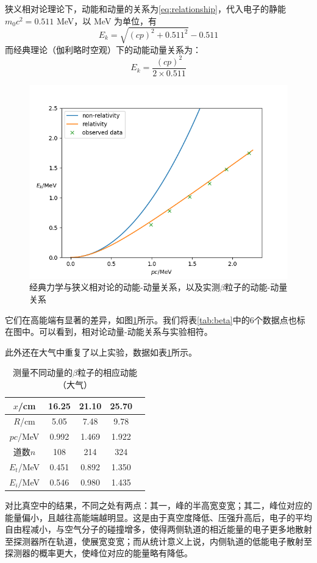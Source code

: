 \documentclass[aps,pre,12pt,preprint,onecolumn,showpacs,showkeys]{revtex4-1}
\begin{document}
    狭义相对论理论下，动能和动量的关系为\ref{eq:relationship}，代入电子的静能$m_0 c^2 = 0.511$ MeV，以 MeV 为单位，有
    \begin{equation}
        E_k = \sqrt{(cp)^2 +0.511 ^2}-0.511
    \end{equation}
    而经典理论（伽利略时空观）下的动能动量关系为：
    \begin{equation}
        E_k =\frac{ (cp)^2 }{2 \times 0.511}
    \end{equation}
    \begin{figure}[ht]
        \centering
        \includegraphics[width=120mm]{relationship}
        \caption{\label{fig:relationship}%
        经典力学与狭义相对论的动能-动量关系，以及实测$\beta$粒子的动能-动量关系}
    \end{figure}
    它们在高能端有显著的差异，如图\ref{fig:relationship}所示。我们将表\ref{tab:beta}中的6个数据点也标在图中。可以看到，相对论动量-动能关系与实验相符。

    此外还在大气中重复了以上实验，数据如表\ref{tab:beta_atmo}所示。
    \begin{table}[h]
        \caption{\label{tab:beta_atmo}%
        测量不同动量的$\beta$粒子的相应动能（大气）}
        \begin{tabular}{|c|c|c|c|c|}
            \hline
            $x$/cm & 16.25 & 21.10 & 25.70\\\hline 
            $R$/cm & 5.05 & 7.48 & 9.78\\\hline
            $pc$/MeV & 0.992 & 1.469 & 1.922\\\hline
            道数$n$ & 108 & 214 & 324\\\hline
            $E_t$/MeV &0.451 & 0.892 & 1.350 \\\hline
            $E_i$/MeV &0.546 & 0.980 & 1.435\\\hline
        \end{tabular}
    \end{table}
    对比真空中的结果，不同之处有两点：其一，峰的半高宽变宽；其二，峰位对应的能量偏小，且越往高能端越明显。这是由于真空度降低、压强升高后，电子的平均自由程减小，与空气分子的碰撞增多，使得两侧轨道的相近能量的电子更多地散射至探测器所在轨道，使展宽变宽；而从统计意义上说，内侧轨道的低能电子散射至探测器的概率更大，使峰位对应的能量略有降低。
\end{document}
